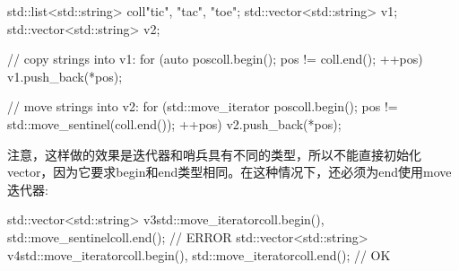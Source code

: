 \begin{cpp}
std::list<std::string> coll{"tic", "tac", "toe"};
std::vector<std::string> v1;
std::vector<std::string> v2;

// copy strings into v1:
for (auto pos{coll.begin()}; pos != coll.end(); ++pos) {
	v1.push_back(*pos);
}

// move strings into v2:
for (std::move_iterator pos{coll.begin()};
pos != std::move_sentinel(coll.end()); ++pos) {
	v2.push_back(*pos);
}
\end{cpp}

注意，这样做的效果是迭代器和哨兵具有不同的类型，所以不能直接初始化vector，因为它要求begin和end类型相同。在这种情况下，还必须为end使用move迭代器:

\begin{cpp}
std::vector<std::string> v3{std::move_iterator{coll.begin()},
							std::move_sentinel{coll.end()}}; // ERROR
std::vector<std::string> v4{std::move_iterator{coll.begin()},
							std::move_iterator{coll.end()}}; // OK
\end{cpp}















